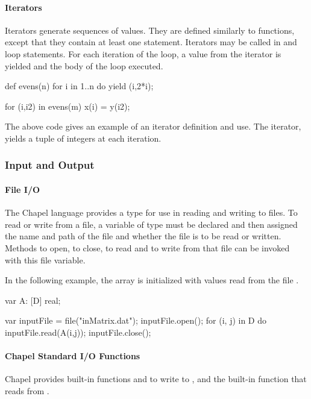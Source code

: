 \paragraph{Iterators}
Iterators generate sequences of values.
They are defined similarly to functions, except that
they contain at least one  statement.
Iterators may be called in  and  loop
statements.  For each iteration of the loop, a value from the
iterator is yielded and the body of the loop executed.
\begin{example}
\begin{chapel}
def evens(n) {
  for i in 1..n do yield (i,2*i);
}

for (i,i2) in evens(m) {
  x(i) = y(i2);
}
\end{chapel}
The above code gives an example of an iterator definition and use.
The iterator,  yields a tuple of integers at each iteration.
\end{example}

\subsubsection{Input and Output}
\paragraph{File I/O}
The Chapel language provides a  type for use in reading and
writing to files.  To read or write from a file, a variable of 
type must be declared and then assigned the name and path of the file 
and whether the file is to be read or written.  Methods to open, to close,
to read and to write from that file can be invoked with this file
variable.

\begin{example}
In the following example, the array  is initialized with
values read from the file .
\begin{chapel}
var A: [D] real;

var inputFile = file("inMatrix.dat");
inputFile.open();
for (i, j) in D do inputFile.read(A(i,j));
inputFile.close();
\end{chapel}
\end{example}

\paragraph{Chapel Standard I/O Functions}
Chapel provides built-in functions  and 
to write to , and the built-in function 
that reads from .

